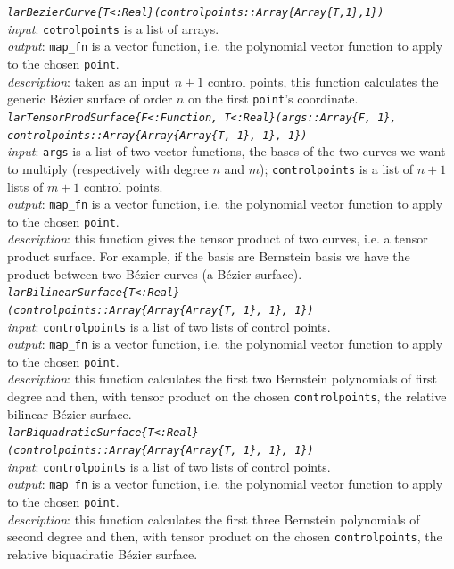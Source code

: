 \documentclass[a4paper,11pt]{article}
\begin{document}
\emph{\texttt{larBezierCurve\{T<:Real\}(controlpoints::Array\{Array\{T,1\},1\})}} \\
\emph{input}: \texttt{cotrolpoints} is a list of arrays. \\
\emph{output}:  \texttt{map\_fn} is a vector function, i.e. the polynomial vector function to apply to the chosen \texttt{point}. \\
\emph{description}: taken as an input $n+1$ control points, this function calculates the generic B\'ezier surface of order $n$ on the first \texttt{point}'s coordinate.  \\

\emph{\texttt{larTensorProdSurface\{F<:Function, T<:Real\}(args::Array\{F, 1\},\\ controlpoints::Array\{Array\{Array\{T, 1\}, 1\}, 1\})}} \\
\emph{input}: \texttt{args} is a list of two vector functions, the bases of the two curves we want to multiply (respectively with degree $n$ and $m$); \texttt{controlpoints} is a list of $n+1$ lists of $m+1$ control points. \\
\emph{output}: \texttt{map\_fn} is a vector function, i.e. the polynomial vector function to apply to the chosen \texttt{point}. \\
\emph{description}: this function gives the tensor product of two curves, i.e. a tensor product surface. For example, if the basis are Bernstein basis we have the product between two B\'ezier curves (a B\'ezier surface).  \\

\emph{\texttt{larBilinearSurface\{T<:Real\} \\ (controlpoints::Array\{Array\{Array\{T, 1\}, 1\}, 1\})}} \\
\emph{input}: \texttt{controlpoints} is a list of two lists of control points. \\
\emph{output}: \texttt{map\_fn} is a vector function, i.e. the polynomial vector function to apply to the chosen \texttt{point}. \\
\emph{description}: this function calculates the first two Bernstein polynomials of first degree and then, with tensor product on the chosen \texttt{controlpoints}, the relative bilinear B\'ezier surface.  \\

\emph{\texttt{larBiquadraticSurface\{T<:Real\} \\ (controlpoints::Array\{Array\{Array\{T, 1\}, 1\}, 1\})}} \\
\emph{input}: \texttt{controlpoints} is a list of two lists of control points. \\
\emph{output}: \texttt{map\_fn} is a vector function, i.e. the polynomial vector function to apply to the chosen \texttt{point}. \\
\emph{description}: this function calculates the first three Bernstein polynomials of second degree and then, with tensor product on the chosen \texttt{controlpoints}, the relative biquadratic B\'ezier surface.  \\
\end{document}
